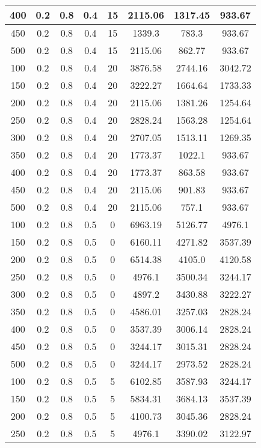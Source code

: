 \documentclass[a4paper, 12pt]{extreport}
\begin{document}
\begin{itemize}
\begin{longtable}{|c|c|c|c|c|c|c|c|}
			400 & 0.2 & 0.8 & 0.4 & 15 & 2115.06 & 1317.45 & 933.67 \\\hline
			450 & 0.2 & 0.8 & 0.4 & 15 & 1339.3 & 783.3 & 933.67 \\\hline
			500 & 0.2 & 0.8 & 0.4 & 15 & 2115.06 & 862.77 & 933.67 \\\hline
			100 & 0.2 & 0.8 & 0.4 & 20 & 3876.58 & 2744.16 & 3042.72 \\\hline
			150 & 0.2 & 0.8 & 0.4 & 20 & 3222.27 & 1664.64 & 1733.33 \\\hline
			200 & 0.2 & 0.8 & 0.4 & 20 & 2115.06 & 1381.26 & 1254.64 \\\hline
			250 & 0.2 & 0.8 & 0.4 & 20 & 2828.24 & 1563.28 & 1254.64 \\\hline
			300 & 0.2 & 0.8 & 0.4 & 20 & 2707.05 & 1513.11 & 1269.35 \\\hline
			350 & 0.2 & 0.8 & 0.4 & 20 & 1773.37 & 1022.1 & 933.67 \\\hline
			400 & 0.2 & 0.8 & 0.4 & 20 & 1773.37 & 863.58 & 933.67 \\\hline
			450 & 0.2 & 0.8 & 0.4 & 20 & 2115.06 & 901.83 & 933.67 \\\hline
			500 & 0.2 & 0.8 & 0.4 & 20 & 2115.06 & 757.1 & 933.67 \\\hline
			100 & 0.2 & 0.8 & 0.5 & 0 & 6963.19 & 5126.77 & 4976.1 \\\hline
			150 & 0.2 & 0.8 & 0.5 & 0 & 6160.11 & 4271.82 & 3537.39 \\\hline
			200 & 0.2 & 0.8 & 0.5 & 0 & 6514.38 & 4105.0 & 4120.58 \\\hline
			250 & 0.2 & 0.8 & 0.5 & 0 & 4976.1 & 3500.34 & 3244.17 \\\hline
			300 & 0.2 & 0.8 & 0.5 & 0 & 4897.2 & 3430.88 & 3222.27 \\\hline
			350 & 0.2 & 0.8 & 0.5 & 0 & 4586.01 & 3257.03 & 2828.24 \\\hline
			400 & 0.2 & 0.8 & 0.5 & 0 & 3537.39 & 3006.14 & 2828.24 \\\hline
			450 & 0.2 & 0.8 & 0.5 & 0 & 3244.17 & 3015.31 & 2828.24 \\\hline
			500 & 0.2 & 0.8 & 0.5 & 0 & 3244.17 & 2973.52 & 2828.24 \\\hline
			100 & 0.2 & 0.8 & 0.5 & 5 & 6102.85 & 3587.93 & 3244.17 \\\hline
			150 & 0.2 & 0.8 & 0.5 & 5 & 5834.31 & 3684.13 & 3537.39 \\\hline
			200 & 0.2 & 0.8 & 0.5 & 5 & 4100.73 & 3045.36 & 2828.24 \\\hline
			250 & 0.2 & 0.8 & 0.5 & 5 & 4976.1 & 3390.02 & 3122.97 \\\hline

\end{longtable}
\end{itemize}
\end{document}
